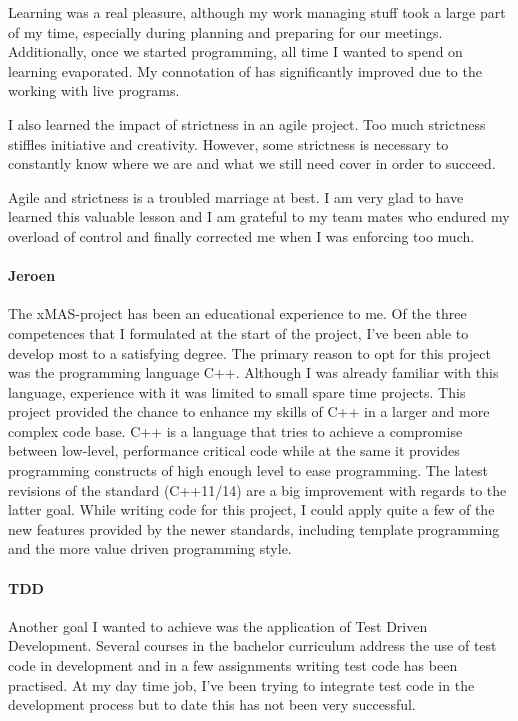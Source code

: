 Learning \cpp was a real pleasure, although my work managing stuff took a large part of my time,
especially during planning and preparing for our meetings. Additionally, once we started programming,
all time I wanted to spend on learning \cpp evaporated. My connotation of \cpp has significantly improved
due to the working with live \cpp programs.

I also learned the impact of strictness in an agile project. Too much strictness stiffles initiative 
and creativity. However, some strictness is necessary to constantly know where we are and what we 
still need cover in order to succeed.

Agile and strictness is a troubled marriage at best. I am very glad to have learned this valuable lesson and
I am grateful to my team mates who endured my overload of control and finally corrected me when I was 
enforcing too much.

\paragraph{Jeroen}
The xMAS-project has been an educational experience to me. Of the three competences
that I formulated at the start of the project, I've been able to develop most to a
satisfying degree. The primary reason to opt for this project was the programming
language C++. Although I was already familiar with this language, experience with it
was limited to small spare time projects. This project provided the chance to
enhance my skills of C++ in a larger and more complex code base. C++ is a language
that tries to achieve a compromise between low-level, performance critical code while at
the same it provides programming constructs of high enough level to ease programming.
The latest revisions of the standard (C++11/14) are a big improvement with regards
to the latter goal. While writing code for this project, I could apply quite a few
of the new features provided by the newer standards, including template programming
and the more value driven programming style.

\paragraph{TDD}
Another goal I wanted to achieve was the application of Test Driven Development.
Several courses in the bachelor curriculum address the use of test code in development
and in a few assignments writing test code has been practised. At my day time job,
I've been trying to integrate test code in the development process but to date
this has not been very successful.

